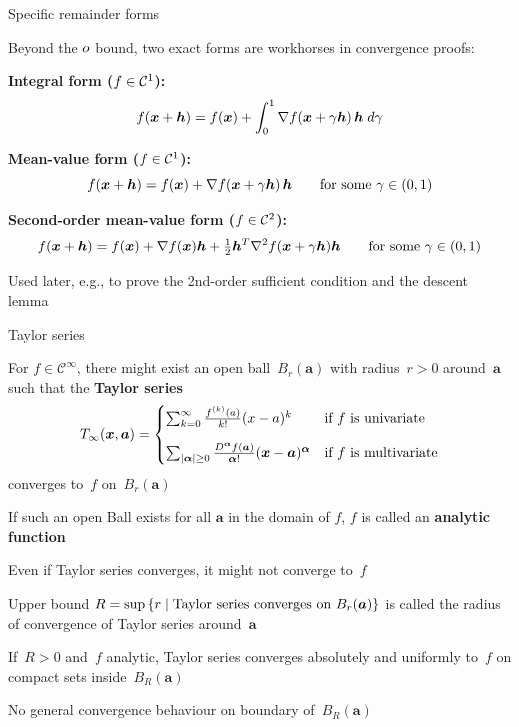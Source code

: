 \documentclass[11pt,compress,t,notes=noshow, xcolor=table]{beamer}
\begin{document}
\begin{framei}[fs=footnotesize]{Specific remainder forms}
\item Beyond the ${o}$ bound, two exact forms are workhorses in convergence proofs:
\item[] \textbf{Integral form ($f \in \mathcal{C}^{1}$):}
$$
f(\bm{x}+\bm{h}) = f(\bm{x}) + \int_0^1 \nabla f(\bm{x} + \gamma \bm{h})\, \bm{h}\; d\gamma
$$
\item[] \textbf{Mean-value form ($f \in \mathcal{C}^{1}$):}
$$
f(\bm{x}+\bm{h}) = f(\bm{x}) + \nabla f(\bm{x} + \gamma \bm{h})\, \bm{h} \qquad \text{for some } \gamma \in (0,1)
$$
\item[] \textbf{Second-order mean-value form ($f \in \mathcal{C}^{2}$):}
$$
f(\bm{x}+\bm{h}) = f(\bm{x}) + \nabla f(\bm{x})\bm{h} + \tfrac{1}{2}\bm{h}^T \nabla^2 f(\bm{x} + \gamma \bm{h}) \bm{h} \qquad \text{for some } \gamma \in (0,1)
$$
\item Used later, e.g., to prove the 2nd-order sufficient condition and the descent lemma
\end{framei}


\begin{framei}{Taylor series}
\item For $f \in \mathcal{C}^\infty$, there might exist an open ball~$B_r(\bm{a})$ with radius~$r>0$ around~$\bm{a}$ such that the \textbf{Taylor series}
$$        
T_\infty(\bm{x},\bm{a})=\begin{cases}
\sum_{k=0}^{\infty} \frac{f^{(k)}(a)}{k!}(x-a)^k&\text{if $f$ is univariate}\\[10pt]
\sum_{|\bm{\alpha}| \geq 0} \frac{D^{\bm{\alpha}} f(\bm{a})}{{\bm{\alpha}}!} (\bm{x} - \bm{a})^{\bm{\alpha}}&\text{if $f$ is multivariate}
\end{cases}
$$
converges to~$f$ on~$B_r(\bm{a})$
\item If such an open Ball exists for all $\bm{a}$ in the domain of $f$, $f$ is called an \textbf{analytic function}
\item Even if Taylor series converges, it might not converge to~$f$
\item Upper bound $R = \sup \left\lbrace r \;|\; \textnormal{Taylor series converges on } B_r(\bm{a}) \right\rbrace$ is called the radius of convergence of Taylor series around~$\bm{a}$
\item If~$R>0$ and~$f$ analytic, Taylor series converges absolutely and uniformly to~$f$ on compact sets inside~$B_R(\bm{a})$
\item No general convergence behaviour on boundary of~$B_R(\bm{a})$
\end{framei}
\end{document}
